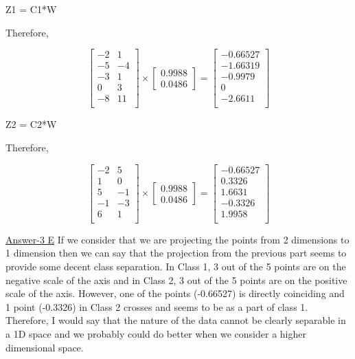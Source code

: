 \documentclass{report}
\begin{document}
\begin{flushleft}
Z1 = C1*W \linebreak[2]

Therefore,

\[
\begin{bmatrix}
-2 & 1 \\
-5 & -4 \\
-3 & 1 \\
0 &	3 \\
-8 & 11 \\
\end{bmatrix}
\times
\begin{bmatrix} 0.9988 \\
 0.0486
\end{bmatrix} =
\begin{bmatrix}
-0.66527 \\
-1.66319 \\
-0.9979 \\
0 \\
-2.6611 \\
\end{bmatrix}
\] \linebreak[2]

Z2 = C2*W \linebreak[2]

Therefore,

\[
\begin{bmatrix}
-2 & 5 \\
1 & 0  \\
5 & -1 \\
-1 & -3 \\
6 & 1 \\
\end{bmatrix}
\times
\begin{bmatrix} 0.9988 \\
 0.0486
\end{bmatrix} =
\begin{bmatrix}
-0.66527 \\
0.3326 \\
1.6631 \\
-0.3326 \\
1.9958 \\
\end{bmatrix}
\] \linebreak[2]

\underline {Answer-3 E}  \linebreak[2]
If we consider that we are projecting the points from 2 dimensions to 1 dimension then we can say that the projection from the previous part seems to provide some decent class separation. In Class 1, 3 out of the 5 points are on the negative scale of the axis and in Class 2, 3 out of the 5 points are on the positive scale of the axis.
However, one of the points (-0.66527) is directly coinciding and 1 point (-0.3326) in Class 2 crosses and seems to be as a part of class 1. Therefore, I would say that the nature of the data cannot be clearly separable in a 1D space and we probably could do better when we consider a higher dimensional space. \linebreak[2]


\end{flushleft}
\end{document}
